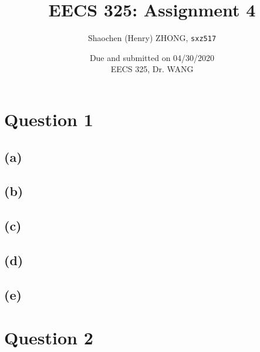 \documentclass[12pt]{article}
\newcommand{\ilc}{\texttt}
\begin{document}
\title{\textbf{EECS 325: Assignment 4}}

\author{Shaochen (Henry) ZHONG, \ilc{sxz517} }
\date{Due and submitted on 04/30/2020 \\ EECS 325, Dr. WANG}
\maketitle

\section{Question 1}

\subsection{(a)}

\subsection{(b)}

\subsection{(c)}

\subsection{(d)}

\subsection{(e)}



\section{Question 2}
\end{document}
